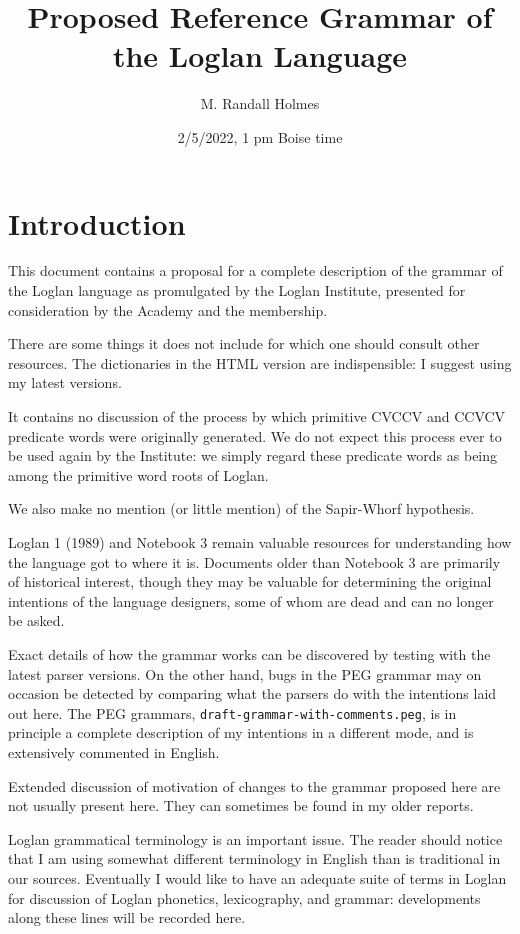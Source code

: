 \documentclass[12pt]{book}
\title{Proposed Reference Grammar of the Loglan Language}
\author{M. Randall Holmes}
\date{2/5/2022, 1 pm Boise time}
\begin{document}
\maketitle

\tableofcontents

\chapter{Introduction}

This document contains a proposal for a complete description of the grammar of the Loglan language as promulgated by the Loglan Institute, presented
for consideration by the Academy and the membership.

There are some things it does not include for which one should consult other resources.  The dictionaries in the HTML version are indispensible:  I suggest using my latest versions.

It contains no discussion of the process by which primitive CVCCV and CCVCV predicate words were originally generated.  We do not expect this process ever to be used again by the Institute:  we simply regard these predicate words as being among the primitive word roots of Loglan.

We also make no mention (or little mention) of the Sapir-Whorf hypothesis.

Loglan 1 (1989) and Notebook 3 remain valuable resources for understanding how the language got to where it is.   Documents older than Notebook 3 are primarily of historical interest, though they may be valuable for determining the original intentions of the language designers, some of whom are dead and can no longer be asked.

Exact details of how the grammar works can be discovered by testing with the latest parser versions.  On the other hand, bugs in the PEG grammar may on occasion be detected by comparing what the parsers do with the intentions laid out here.  The PEG grammars, {\tt draft-grammar-with-comments.peg}, is in principle a complete description of my intentions in a different mode, and is extensively commented in English.

Extended discussion of motivation of changes to the grammar proposed here are not usually present here.  They can sometimes be found in my older reports.

Loglan grammatical terminology is an important issue.  The reader should notice that I am using somewhat different terminology in English than is traditional in our sources.  Eventually I would like to have an adequate suite of terms in Loglan for discussion of Loglan phonetics, lexicography, and grammar:  developments along these lines will be recorded here.
\end{document}

